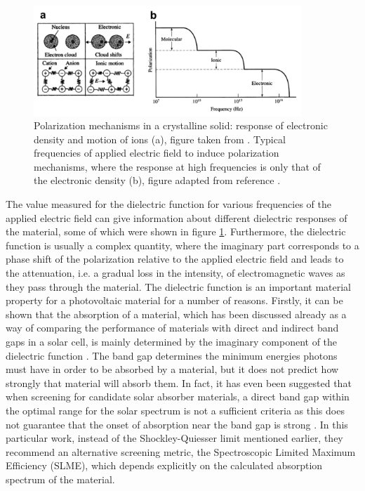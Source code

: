 \begin{figure}[h!]
  \centering
    \includegraphics[width=0.9\textwidth]{figures/dielectric.png}
    \caption{Polarization mechanisms in a crystalline solid: response of electronic density and motion of ions (a), figure taken from . Typical frequencies of applied electric field to induce polarization mechanisms, where the response at high frequencies is only that of the electronic density (b), figure adapted from reference .}
  \label{dielectric}
\end{figure}

The value measured for the dielectric function for various frequencies of the applied electric field can give information about different dielectric responses of the material, some of which were shown in figure \ref{dielectric}. Furthermore, the dielectric function is usually a complex quantity, where the imaginary part corresponds to a phase shift of the polarization relative to the applied electric field and leads to the attenuation, i.e. a gradual loss in the intensity, of electromagnetic waves as they pass through the material. The dielectric function is an important material property for a photovoltaic material for a number of reasons. Firstly, it can be shown that the absorption of a material, which has been discussed already as a way of comparing the performance of materials with direct and indirect band gaps in a solar cell, is mainly determined by the imaginary component of the dielectric function \cite{dielectric_func_book1}. The band gap determines the minimum energies photons must have in order to be absorbed by a material, but it does not predict how strongly that material will absorb them. 
In fact, it has even been suggested that when screening for candidate solar absorber materials, a direct band gap within the optimal range for the solar spectrum is not a sufficient criteria as this does not guarantee that the onset of absorption near the band gap is strong \cite{SLME}. In this particular work, instead of the Shockley-Quiesser limit mentioned earlier, they recommend an alternative screening metric, the Spectroscopic Limited Maximum Efficiency (SLME), which depends explicitly on the calculated absorption spectrum of the material.

